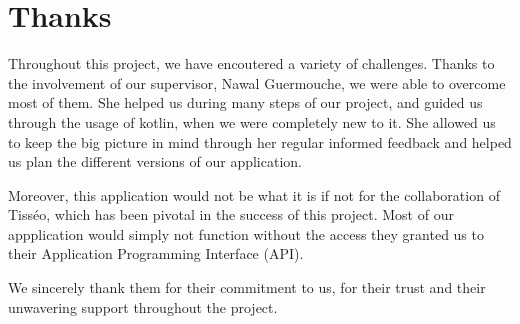 \section*{Thanks}

Throughout this project, we have encoutered a variety of challenges. Thanks to the involvement of our supervisor, Nawal Guermouche, we were able to overcome most of them. She helped us during many steps of our project, and guided us through the usage of kotlin, when we were completely new to it. She allowed us to keep the big picture in mind through her regular informed feedback and helped us plan the different versions of our application.

Moreover, this application would not be what it is if not for the collaboration of Tisséo, which has been pivotal in the success of this project. Most of our appplication would simply not function without the access they granted us to their Application Programming Interface (API)\cite{tisseo}.

We sincerely thank them for their commitment to us, for their trust and their unwavering support throughout the project.
